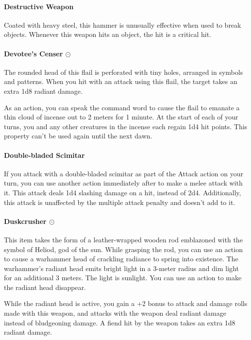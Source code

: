     \paragraph{Destructive Weapon}
        Coated with heavy steel, this hammer is unusually effective when used to break objects.
        Whenever this weapon hits an object, the hit is a critical hit.
    \paragraph{Devotee's Censer $\odot$}
        The rounded head of this flail is perforated with tiny holes, arranged in symbols and patterns.
        When you hit with an attack using this flail, the target takes an extra 1d8 radiant damage.

        As an action, you can speak the command word to cause the flail to emanate a thin cloud of incense out to 2 meters for 1 minute.
        At the start of each of your turns, you and any other creatures in the incense each regain 1d4 hit points.
        This property can't be used again until the next dawn.
    \paragraph{Double-bladed Scimitar}
        If you attack with a double-bladed scimitar as part of the Attack action on your turn, you can use another action immediately after to make a melee attack with it.
        This attack deals 1d4 slashing damage on a hit, instead of 2d4.
        Additionally, this attack is unaffected by the multiple attack penalty and doesn't add to it.
    \paragraph{Duskcrusher $\odot$}
        This item takes the form of a leather-wrapped wooden rod emblazoned with the symbol of Heliod, god of the sun.
        While grasping the rod, you can use an action to cause a warhammer head of crackling radiance to spring into existence.
        The warhammer's radiant head emits bright light in a 3-meter radius and dim light for an additional 3 meters.
        The light is sunlight.
        You can use an action to make the radiant head disappear.

        While the radiant head is active, you gain a +2 bonus to attack and damage rolls made with this weapon, and attacks with the weapon deal radiant damage instead of bludgeoning damage.
        A fiend hit by the weapon takes an extra 1d8 radiant damage.


